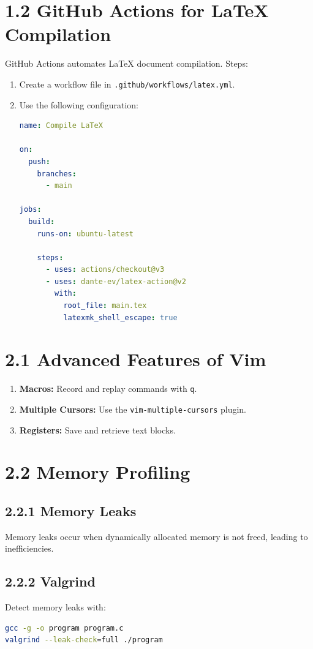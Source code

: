 \documentclass[12pt]{article}
\begin{document}
\section*{1.2 GitHub Actions for LaTeX Compilation}
GitHub Actions automates LaTeX document compilation. Steps:
\begin{enumerate}
    \item Create a workflow file in \texttt{.github/workflows/latex.yml}.
    \item Use the following configuration:
    \begin{lstlisting}[language=yaml]
name: Compile LaTeX

on:
  push:
    branches:
      - main

jobs:
  build:
    runs-on: ubuntu-latest

    steps:
      - uses: actions/checkout@v3
      - uses: dante-ev/latex-action@v2
        with:
          root_file: main.tex
          latexmk_shell_escape: true
    \end{lstlisting}
\end{enumerate}

\section*{2.1 Advanced Features of Vim}
\begin{enumerate}
    \item \textbf{Macros:} Record and replay commands with \texttt{q}.
    \item \textbf{Multiple Cursors:} Use the \texttt{vim-multiple-cursors} plugin.
    \item \textbf{Registers:} Save and retrieve text blocks.
\end{enumerate}

\section*{2.2 Memory Profiling}
\subsection*{2.2.1 Memory Leaks}
Memory leaks occur when dynamically allocated memory is not freed, leading to inefficiencies.

\subsection*{2.2.2 Valgrind}
Detect memory leaks with:
\begin{lstlisting}[language=bash]
gcc -g -o program program.c
valgrind --leak-check=full ./program
\end{lstlisting}
\end{document}
